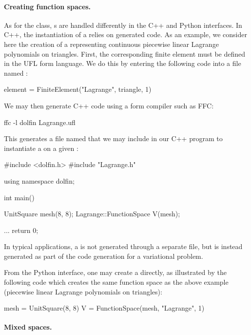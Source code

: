 \paragraph{Creating function spaces.}

As for the  class, s are handled
differently in the C++ and Python interfaces. In C++, the instantiation
of a  relies on generated code. As an example,
we consider here the creation of a  representing
continuous piecewise linear Lagrange polynomials on triangles. First,
the corresponding finite element must be defined in the UFL form
language. We do this by entering the following code into a file named
:
\begin{uflcode}
element = FiniteElement("Lagrange", triangle, 1)
\end{uflcode}
We may then generate C++ code using a form compiler such as FFC:
\begin{bash}
ffc -l dolfin Lagrange.ufl
\end{bash}
This generates a file named  that we may include in
our C++ program to instantiate a  on a given
:
\begin{c++}
#include <dolfin.h>
#include "Lagrange.h"

using namespace dolfin;

int main()
{
  UnitSquare mesh(8, 8);
  Lagrange::FunctionSpace V(mesh);

  ...
  return 0;
}
\end{c++}
In typical applications, a  is not generated
through a separate  file, but is instead generated as part
of the code generation for a variational problem.

From the Python interface, one may create a 
directly, as illustrated by the following code which creates the same
function space as the above example (piecewise linear Lagrange
polynomials on triangles):

\begin{python}
mesh = UnitSquare(8, 8)
V = FunctionSpace(mesh, "Lagrange", 1)
\end{python}

\paragraph{Mixed spaces.}


